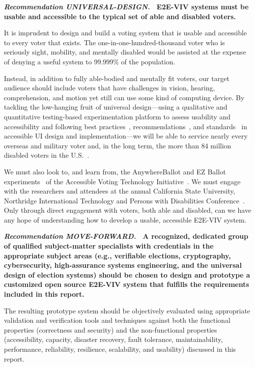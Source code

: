 \vspace{12pt} 
\textbf{\emph{Recommendation UNIVERSAL-DESIGN.} \ E2E-VIV
  systems must be usable and accessible to the typical set of able and
  disabled voters.}

It is imprudent to design and build a voting system that is usable and
accessible to every voter that exists. The one-in-one-hundred-thousand
voter who is seriously sight, mobility, and mentally disabled would be
assisted at the expense of denying a useful system to 99.999\% of the
population.

Instead, in addition to fully able-bodied and mentally fit voters, our
target audience should include voters that have challenges in vision,
hearing, comprehension, and motion yet still can use some kind of
computing device. By tackling the low-hanging fruit of universal
design---using a qualitative and quantitative testing-based
experimentation platform to assess usability and accessibility and
following best practices~\cite{materials-at-elections.itif.org},
recommendations~\cite{WAI,Section508,WAVE}, and
standards~\cite{standards} in accessible UI design and
implementation---we will be able to service nearly every overseas and
military voter and, in the long term, the more than 84 million
disabled voters in the U.S.~\cite{Brennen,CensusData}.

We must also look to, and learn from, the AnywhereBallot and EZ Ballot
experiments~\cite{AnywhereBallot,lee2012ez} of the Accessible Voting
Technology Initiative~\cite{AVTI}.  We must engage with the
researchers and attendees at the annual California State University,
Northridge International Technology and Persons with Disabilities
Conference~\cite{CSUN}. Only through direct engagement with voters,
both able and disabled, can we have any hope of understanding how to
develop a usable, accessible E2E-VIV system.

\vspace{12pt} 

\textbf{\emph{Recommendation MOVE-FORWARD.} \ A recognized, dedicated
  group of qualified subject-matter specialists with credentials in
  the appropriate subject areas (e.g., verifiable elections,
  cryptography, cybersecurity, high-assurance systems engineering, and
  the universal design of election systems) should be chosen to design
  and prototype a customized open source E2E-VIV system that fulfills
  the requirements included in this report.}

The resulting prototype system should be objectively evaluated using
appropriate validation and verification tools and techniques against
both the functional properties (correctness and security) and the 
non-functional properties (accessibility, capacity, disaster recovery,
fault tolerance, maintainability, performance, reliability,
resilience, scalability, and usability) discussed in this report.

